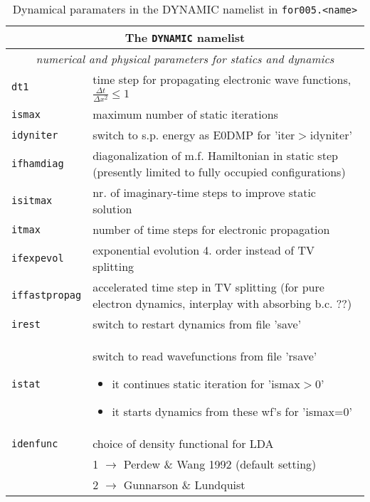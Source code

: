 \documentclass[11pt,a4paper]{article}
\begin{document}
			\begin{table}[t]
				\caption{Dynamical paramaters in the DYNAMIC namelist in \texttt{for005.<name>}}\label{tab:dyn-input-params-general}
				\begin{tabular}{|p{3.5cm}|p{11.2cm}|}
					\hline
					\multicolumn{2}{|c|}{The \texttt{DYNAMIC} namelist}\\
					\hline
					\multicolumn{2}{|c|}{\textit{\color{activeColor}numerical and physical parameters for statics and dynamics}} \\
					\hline
					\texttt{dt1}& time step for propagating electronic wave functions,  $\frac{\Delta t}{\Delta x^{2}}\leq 1$\\
					\hline
					\texttt{ismax}& maximum number of static iterations \\
					\hline
					\texttt{idyniter}& switch to s.p. energy as E0DMP for 'iter$>$idyniter'\\
					\hline
					\texttt{ifhamdiag} & diagonalization of m.f. Hamiltonian in static step (presently limited to fully occupied configurations)\\
					\texttt{isitmax}& nr. of imaginary-time steps to improve static solution\\
					\hline
					\texttt{itmax}& number of time steps for electronic propagation\\
					\hline
					\texttt{ifexpevol} & exponential evolution 4. order instead of TV splitting\\
					\hline
					\texttt{iffastpropag} & accelerated time step in TV splitting (for pure electron dynamics, interplay with absorbing b.c. ??)\\
					\hline
					\texttt{irest}& switch to restart dynamics from file 'save'\\
					\hline
					\texttt{istat}& switch to read wavefunctions from file 'rsave'
					\begin{itemize}
						\item it continues static iteration for 'ismax$>$0'
						\item it starts dynamics from these wf's for 'ismax=0'
						\vspace{-3ex}
					\end{itemize}\\
					\hline
					\texttt{idenfunc} & choice of density functional for LDA\\
						& 1 $\rightarrow$ Perdew \& Wang 1992 (default setting)\\
						& 2 $\rightarrow$ Gunnarson \& Lundquist\\

\end{tabular}
\end{table}
\end{document}
